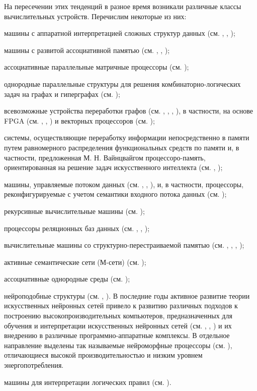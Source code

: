 На пересечении этих тенденций в разное время возникали различные классы вычислительных устройств. Перечислим некоторые из них:
\begin{textitemize}
\item машины с аппаратной интерпретацией сложных структур данных (см. , , );
\item машины с развитой ассоциативной памятью (см. , , );
\item ассоциативные параллельные матричные процессоры (см. );
\item однородные параллельные структуры для решения комбинаторно-логических задач на графах и гиперграфах (см. );
\item всевозможные устройства переработки графов (см. , , , ), в частности, на основе FPGA (см. , , ) и векторных процессоров (см. );
\item системы, осуществляющие переработку информации непосредственно в памяти путем равномерного распределения функциональных средств по памяти и, в частности, предложенная М. Н. Вайнцвайгом процессоро-память, ориентированная на решение задач искусственного интеллекта (см. , );
\item машины, управляемые потоком данных (см. , , ), и, в частности, процессоры, реконфигурируемые с учетом семантики входного потока данных (см. );
\item рекурсивные вычислительные машины (см. );
\item процессоры реляционных баз данных (см. , , );
\item вычислительные машины со структурно-перестраиваемой памятью (см. , , , );
\item активные семантические сети (М-сети) (см. );
\item ассоциативные однородные среды (см. );
\item нейроподобные структуры (см. , ). В последние годы активное развитие теории искусственных нейронных сетей привело к развитию различных подходов к построению высокопроизводительных компьютеров, предназначенных для обучения и интерпретации искусственных нейронных сетей (см. , , ) и их внедрению в различные программно-аппаратные комплексы. В отдельное направление выделены так называемые нейроморфные процессоры (см. ), отличающиеся высокой производительностью и низким уровнем энергопотребления.
\item машины для интерпретации логических правил (см. ).
\end{textitemize}

